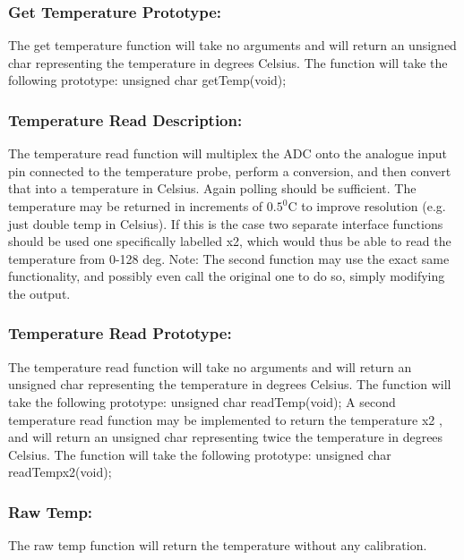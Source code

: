 \documentclass[]{article}
\begin{document}
\subsubsection{Get Temperature Prototype:}
The get temperature function will take no arguments and will return an unsigned char representing the temperature in degrees Celsius. The function will take the following prototype: \newline \newline 
unsigned char getTemp(void);

\subsubsection{Temperature Read Description:}
The temperature read function will multiplex the ADC onto the analogue input pin connected to the temperature probe, perform a conversion, and then convert that into a temperature in Celsius. Again polling should be sufficient. The temperature may be returned in increments of $0.5^0$C to improve resolution (e.g. just double temp in Celsius). If this is the case two separate interface functions should be used one specifically labelled x2, which would thus be able to read the temperature from 0-128 deg. Note: The second function may use the exact same functionality, and possibly even call the original one to do so, simply modifying the output.

\subsubsection{Temperature Read Prototype:}
The temperature read function will take no arguments and will return an unsigned char representing the temperature in degrees Celsius. The function will take the following prototype: \newline \newline
unsigned char readTemp(void);
\newline \newline
A second temperature read function may be implemented to return the temperature x2 , and will return an unsigned char representing twice the temperature in degrees Celsius. The function will take the following prototype: \newline \newline
unsigned char readTempx2(void);

\subsubsection{Raw Temp:}
The raw temp function will return the temperature without any calibration.
\end{document}
